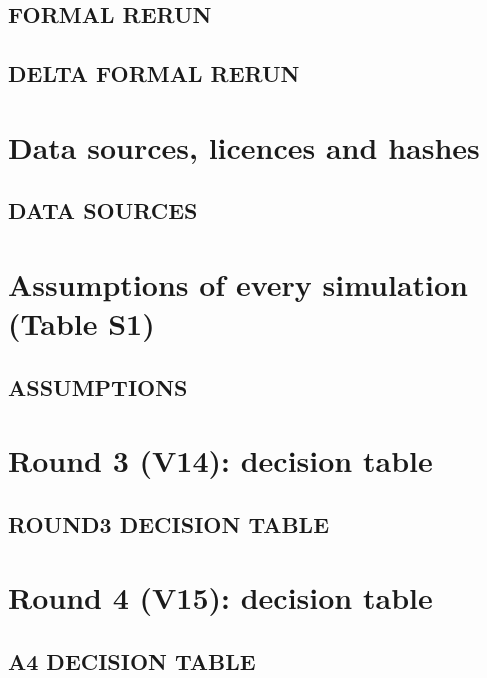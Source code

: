 \documentclass[10pt,a4paper]{article}
\begin{document}
\subsection{FORMAL RERUN}


\subsection{DELTA FORMAL RERUN}


\section{Data sources, licences and hashes}

\subsection{DATA SOURCES}


\section{Assumptions of every simulation (Table S1)}

\subsection{ASSUMPTIONS}


\section{Round 3 (V14): decision table}

\subsection{ROUND3 DECISION TABLE}


\section{Round 4 (V15): decision table}

\subsection{A4 DECISION TABLE}

\end{document}
